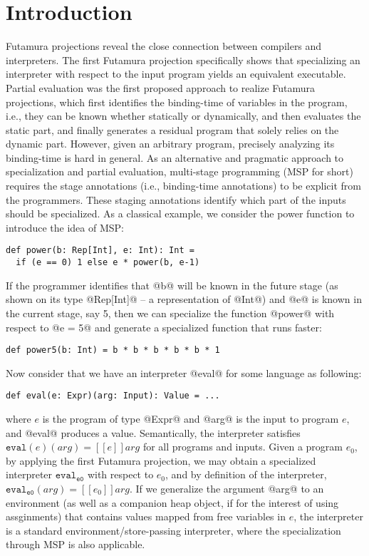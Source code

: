 \section{Introduction}

Futamura projections \cite{Futamura1999, futamura1971partial} reveal the close
connection between compilers and interpreters. The first Futamura projection
specifically shows that specializing an interpreter with respect to the input
program yields an equivalent executable. Partial evaluation
\cite{DBLP:books/daglib/0072559} was the first proposed approach to realize
Futamura projections, which first identifies the binding-time of variables in
the program, i.e., they can be known whether statically or dynamically, and then
evaluates the static part, and finally generates a residual program that solely
relies on the dynamic part. However, given an arbitrary program, precisely
analyzing its binding-time is hard in general. As an alternative and pragmatic
approach to specialization and partial evaluation, multi-stage programming (MSP
for short) \cite{taha1999multi, DBLP:conf/pepm/TahaS97} requires the stage
annotations (i.e., binding-time annotations) to be explicit from the programmers.
These staging annotations identify which part of the inputs should be
specialized. As a classical example, we consider the power function to introduce
the idea of MSP:

\begin{lstlisting}
def power(b: Rep[Int], e: Int): Int = 
  if (e == 0) 1 else e * power(b, e-1)
\end{lstlisting}

If the programmer identifies that @b@ will be known in the future stage (as shown
on its type @Rep[Int]@ -- a representation of @Int@) and @e@ is known in the
current stage, say 5, then we can specialize the function @power@ with
respect to @e = 5@ and generate a specialized function that runs faster:

\begin{lstlisting}
def power5(b: Int) = b * b * b * b * b * 1
\end{lstlisting}

Now consider that we have an interpreter @eval@ for some language as following:

\begin{lstlisting}
def eval(e: Expr)(arg: Input): Value = ...
\end{lstlisting}

where $e$ is the program of type @Expr@ and @arg@ is the input to program $e$,
and @eval@ produces a value.
Semantically, the interpreter satisfies $ \texttt{eval}(e)(arg) = [\![ e ]\!] arg$ for all
programs and inputs. Given a program $e_0$, by applying the first Futamura
projection, we may obtain a specialized interpreter
$\texttt{eval}_{\texttt{e0}}$ with respect to $e_0$, and by definition of the interpreter, 
$\texttt{eval}_{\texttt{e0}}(arg) = [\![ e_0 ]\!] arg $. If we generalize the
argument @arg@ to an environment (as well as a companion heap object, if for the
interest of using assginments) that contains values mapped from free variables
in $e$, the interpreter is a standard environment/store-passing interpreter,
where the specialization through MSP is also applicable.

